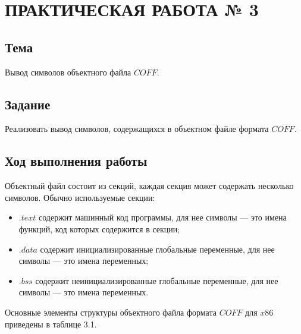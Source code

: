 \chapter{ПРАКТИЧЕСКАЯ РАБОТА № 3}

\section{Тема}

Вывод символов объектного файла $COFF$.

\section{Задание}

Реализовать вывод символов, содержащихся в объектном файле формата $COFF$.

\section{Ход выполнения работы}

Объектный файл состоит из секций, каждая секция может содержать несколько символов.
Обычно используемые секции:
	\begin{itemize}
		\item{$.text$ содержит машинный код программы, для нее символы --- это имена функций, код которых содержится в секции;}
		\item{$.data$ содержит инициализированные глобальные переменные, для нее символы --- это имена переменных;}
		\item{$.bss$ содержит неинициализированные глобальные переменные, для нее символы --- это имена переменных.}
	\end{itemize}

Основные элементы структуры объектного файла формата $COFF$ для $x86$ приведены в таблице 3.1.

